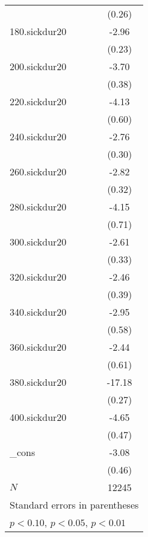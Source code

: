 \documentclass{article}
\begin{document}
{\begin{tabular}{l*{1}{c}}
            &      (0.26)         \\
[1em]
180.sickdur20&       -2.96\sym{***}\\
            &      (0.23)         \\
[1em]
200.sickdur20&       -3.70\sym{***}\\
            &      (0.38)         \\
[1em]
220.sickdur20&       -4.13\sym{***}\\
            &      (0.60)         \\
[1em]
240.sickdur20&       -2.76\sym{***}\\
            &      (0.30)         \\
[1em]
260.sickdur20&       -2.82\sym{***}\\
            &      (0.32)         \\
[1em]
280.sickdur20&       -4.15\sym{***}\\
            &      (0.71)         \\
[1em]
300.sickdur20&       -2.61\sym{***}\\
            &      (0.33)         \\
[1em]
320.sickdur20&       -2.46\sym{***}\\
            &      (0.39)         \\
[1em]
340.sickdur20&       -2.95\sym{***}\\
            &      (0.58)         \\
[1em]
360.sickdur20&       -2.44\sym{***}\\
            &      (0.61)         \\
[1em]
380.sickdur20&      -17.18\sym{***}\\
            &      (0.27)         \\
[1em]
400.sickdur20&       -4.65\sym{***}\\
            &      (0.47)         \\
[1em]
\_cons      &       -3.08\sym{***}\\
            &      (0.46)         \\
\hline
\(N\)       &       12245         \\
\hline\hline
\multicolumn{2}{l}{\footnotesize Standard errors in parentheses}\\
\multicolumn{2}{l}{\footnotesize \sym{*} \(p<0.10\), \sym{**} \(p<0.05\), \sym{***} \(p<0.01\)}\\
\end{tabular}
}
\end{document}
